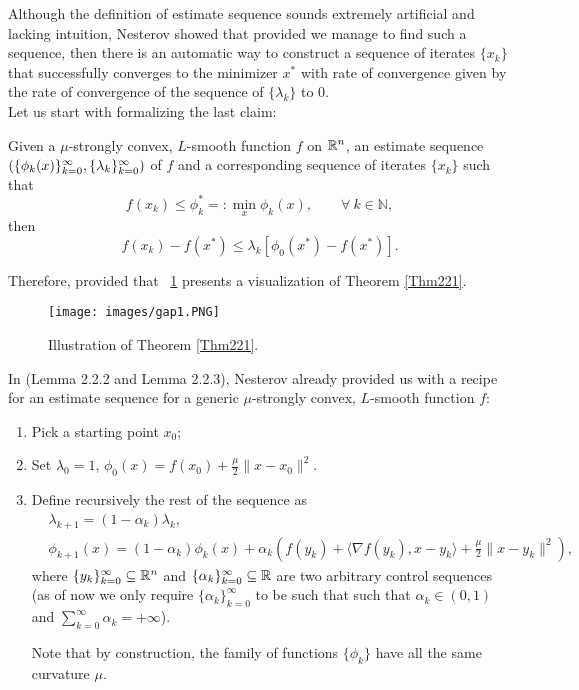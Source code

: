 \documentclass{article}
\begin{document}
Although the definition of estimate sequence sounds extremely artificial and lacking intuition, Nesterov showed that provided we manage to find such a sequence, then there is an automatic way to construct a sequence of iterates $\{x_k\}$ that successfully converges to the minimizer $x^\ast$ with rate of convergence given by the rate of convergence of the sequence of $\{\lambda_k\}$ to 0.\\

Let us start with formalizing the last claim:


\begin{thm}\label{Thm221}

Given a $\mu$-strongly convex, $L$-smooth function $f$ on $\mathbb{R}^n$, an estimate sequence $\left( \{\phi_k(x)\}_{k=0}^\infty, \{\lambda_k\}_{k=0}^\infty \right)$ of $f$ and a corresponding sequence of iterates $\{x_k\}$ such that 
$$f(x_k) \leq \phi_{k}^{\ast} =: \min\limits_{x} \phi_k (x), \qquad \forall \ k \in \mathbb{N},$$ 
then
\[
	f(x_k) - f(x^*) \leq \lambda_k \left[ \phi_0(x^*) - f(x^*) \right].
\]
\end{thm}

Therefore, provided that 
\figurename \ \ref{Thm221plot} presents a visualization of Theorem \ref{Thm221}. 
\begin{figure}
  \centering
  \texttt{[image: images/gap1.PNG]}
  \caption{Illustration of Theorem \ref{Thm221}.\label{Thm221plot}}
\end{figure}
\newline


In \cite{Nesterov1998} (Lemma 2.2.2 and Lemma 2.2.3), Nesterov already provided us with a recipe for an estimate sequence for a generic $\mu$-strongly convex, $L$-smooth function $f$: 
\begin{enumerate}
\item Pick a starting point $x_0$;
\item Set  $\lambda_0 = 1$, $\phi_0{(x)} = f(x_0) + \frac{\mu}{2}\|{x - x_0}\|^2$.
\item Define recursively the rest of the sequence as
\begin{align}
& \lambda_{k+1} = (1-\alpha_k)\lambda_k, \\
& \phi_{k+1}(x) = (1-\alpha_k)\phi_k(x) + \alpha_k\left( f(y_k) + \langle\nabla f(y_k), x-y_k\rangle + \frac{\mu}{2}\lVert{x - y_k}\rVert^2\right ) ,
\end{align}
where $\{y_k\}_{k=0}^{\infty} \subseteq \mathbb{R}^n$ and  $\{\alpha_k\}_{k=0}^{\infty} \subseteq \mathbb{R}$ are two arbitrary control sequences (as of now we only require $\{\alpha_k\}_{k=0}^{\infty}$ to be such that such that $\alpha_k \in (0, 1)$ and $\sum_{k=0}^\infty{\alpha_k} = +\infty$). 

Note that by construction, the family of functions $\{\phi_k\}$ have all the same curvature $\mu$.
\end{enumerate}
\end{document}
